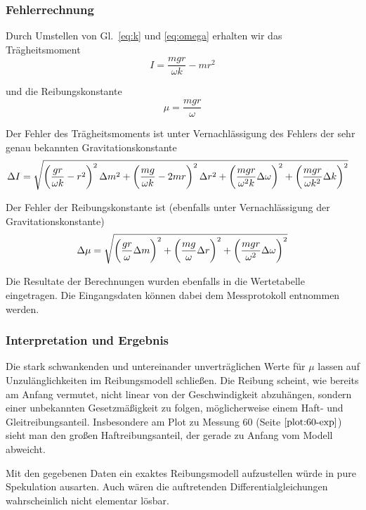 \documentclass[a4paper,german,12pt,smallheadings]{scrartcl}
\begin{document}
\subsubsection{Fehlerrechnung}
Durch Umstellen von Gl.~\ref{eq:k} und \ref{eq:omega} erhalten wir das
Trägheitsmoment
\begin{equation}
  I = \frac{mgr}{\omega k} - mr^2
\end{equation}

und die Reibungskonstante
\begin{equation}
  \mu = \frac{mgr}{\omega}
\end{equation}

Der Fehler des Trägheitsmoments ist unter Vernachlässigung des Fehlers der sehr
genau bekannten Gravitationskonstante %
\begin{align*}
  \Delta I
  &= \sqrt{
  \del{\frac{gr}{\omega k} - r^2}^2 \Delta m^2 +
  \del{\frac{mg}{\omega k} - 2mr}^2 \Delta r^2 +
  \del{\frac{mgr}{\omega^2k} \Delta \omega}^2 +
  \del{\frac{mgr}{\omega k^2} \Delta k}^2
  }
\end{align*}

Der Fehler der Reibungskonstante ist (ebenfalls unter Vernachlässigung der
Gravitationskonstante)
\begin{equation}
  \Delta \mu = \sqrt{
    \del{\frac{gr}{\omega} \Delta m}^2 +
    \del{\frac{mg}{\omega} \Delta r}^2 +
    \del{\frac{mgr}{\omega^2} \Delta \omega}^2
  }
\end{equation}

Die Resultate der Berechnungen wurden ebenfalls in die Wertetabelle
eingetragen. Die Eingangsdaten können dabei dem Messprotokoll entnommen werden.

\subsubsection{Interpretation und Ergebnis}
Die stark schwankenden und untereinander unverträglichen Werte für $\mu$ lassen
auf Unzulänglichkeiten im Reibungsmodell schließen. Die Reibung scheint, wie
bereits am Anfang vermutet, nicht linear von der Geschwindigkeit abzuhängen,
sondern einer unbekannten
Gesetzmäßigkeit zu folgen, möglicherweise einem Haft- und Gleitreibungsanteil.
Insbesondere am Plot zu Messung 60 (Seite $\pageref{plot:60-exp}$) sieht man
den großen Haftreibungsanteil, der gerade zu Anfang vom Modell abweicht.

Mit den gegebenen Daten ein exaktes Reibungsmodell aufzustellen würde in pure
Spekulation ausarten. Auch wären die auftretenden Differentialgleichungen
wahrscheinlich nicht elementar lösbar.
\end{document}
